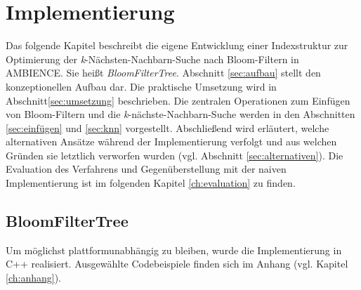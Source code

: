 \chapter{Implementierung}\label{ch:implementierung}
Das folgende Kapitel beschreibt die eigene Entwicklung einer Indexstruktur zur Optimierung der \textit{k}-Nächsten-Nachbarn-Suche nach Bloom-Filtern in AMBIENCE. Sie heißt \textit{BloomFilterTree}. Abschnitt \ref{sec:aufbau} stellt den konzeptionellen Aufbau dar. Die praktische Umsetzung wird in Abschnitt\ref{sec:umsetzung} beschrieben. Die zentralen Operationen zum Einfügen von Bloom-Filtern und die \textit{k}-nächste-Nachbarn-Suche werden in den Abschnitten \ref{sec:einfügen} und \ref{sec:knn} vorgestellt. Abschließend wird erläutert, welche alternativen Ansätze während der Implementierung verfolgt und aus welchen Gründen sie letztlich verworfen wurden (vgl. Abschnitt \ref{sec:alternativen}). Die Evaluation des Verfahrens und Gegenüberstellung mit der naiven Implementierung ist im folgenden Kapitel \ref{ch:evaluation} zu finden.  
\section{BloomFilterTree}\label{sec:bloom-filter-tree}
Um möglichst plattformunabhängig zu bleiben, wurde die Implementierung in C++ realisiert. Ausgewählte Codebeispiele finden sich im Anhang (vgl. Kapitel \ref{ch:anhang}).  

